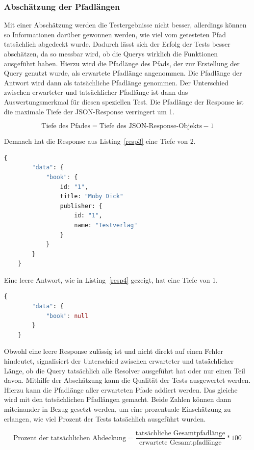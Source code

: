 \subsubsection{Abschätzung der Pfadlängen}

Mit einer Abschätzung werden die Testergebnisse nicht besser, allerdings können so Informationen darüber gewonnen werden, wie viel
vom getesteten Pfad tatsächlich abgedeckt wurde.
Dadurch lässt sich der Erfolg der Tests besser abschätzen, da so messbar wird, ob die Querys wirklich die Funktionen ausgeführt haben.
Hierzu wird die Pfadlänge des Pfads, der zur Erstellung der Query genutzt wurde, als erwartete Pfadlänge angenommen.
Die Pfadlänge der Antwort wird dann als tatsächliche Pfadlänge genommen.
Der Unterschied zwischen erwarteter und tatsächlicher Pfadlänge ist dann das Auswertungsmerkmal für diesen speziellen Test.
Die Pfadlänge der Response ist die maximale Tiefe der JSON-Response verringert um 1.

\[ \text{Tiefe des Pfades} = \text{Tiefe des JSON-Response-Objekts} - 1 \]

Demnach hat die Response aus Listing~\ref{resp3} eine Tiefe von 2.

\begin{lstlisting}[language=GraphQL, caption={vollständige Response}, label={resp3}]
    {
        "data": {
            "book": {
                id: "1",
                title: "Moby Dick"
                publisher: {
                    id: "1",
                    name: "Testverlag"
                }
            }
        }
    }
\end{lstlisting}

Eine leere Antwort, wie in Listing~\ref{resp4} gezeigt, hat eine Tiefe von 1.

\begin{lstlisting}[language=GraphQL, caption={mangelhafte Response}, label={resp4}]
    {
        "data": {
            "book": null
        }
    }
\end{lstlisting}

Obwohl eine leere Response zulässig ist und nicht direkt auf einen Fehler hindeutet, signalisiert der Unterschied zwischen erwarteter und tatsächlicher Länge,
ob die Query tatsächlich alle Resolver ausgeführt hat oder nur einen Teil davon.
Mithilfe der Abschätzung kann die Qualität der Tests ausgewertet werden.
Hierzu kann die Pfadlänge aller erwarteten Pfade addiert werden.
Das gleiche wird mit den tatsächlichen Pfadlängen gemacht.
Beide Zahlen können dann miteinander in Bezug gesetzt werden, um eine prozentuale Einschätzung zu erlangen, wie viel Prozent der Tests
tatsächlich ausgeführt wurden.
\begin{definition}
    \[ \text{Prozent der tatsächlichen Abdeckung} = \frac{\text{tatsächliche Gesamtpfadlänge}}{\text{erwartete Gesamtpfadlänge}} * 100 \]
\end{definition}

